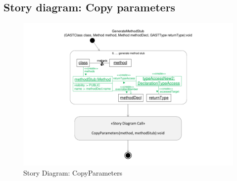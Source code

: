 \subsection{Story diagram: Copy parameters} \label{sec:SDCopyParameters}

\begin{figure}[hbtp]
\centering
\includegraphics[width=\linewidth]{./figures/SDCopyParameters}
\caption{Story Diagram: CopyParameters}
\label{fig:SDCopyParameters}
\end{figure}